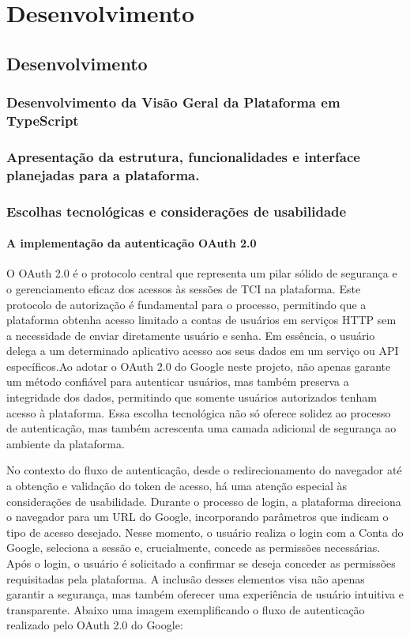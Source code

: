 \part{Desenvolvimento}
\chapter{Desenvolvimento}

\section{Desenvolvimento da Visão Geral da Plataforma em TypeScript}
\section{Apresentação da estrutura, funcionalidades e interface planejadas para a plataforma.}
\section{Escolhas tecnológicas e considerações de usabilidade}

\subsection{A implementação da autenticação OAuth 2.0}
O OAuth 2.0 é o protocolo central que representa um pilar sólido de segurança e o gerenciamento eficaz dos acessos às sessões de TCI na plataforma. Este protocolo de autorização é fundamental para o processo, permitindo que a plataforma obtenha acesso limitado a contas de usuários em serviços HTTP sem a necessidade de enviar diretamente usuário e senha. Em essência, o usuário delega a um determinado aplicativo acesso aos seus dados em um serviço ou API específicos.\cite{OAUTH}Ao adotar o OAuth 2.0 do Google neste projeto, não apenas garante um método confiável para autenticar usuários, mas também preserva a integridade dos dados, permitindo que somente usuários autorizados tenham acesso à plataforma. Essa escolha tecnológica não só oferece solidez ao processo de autenticação, mas também acrescenta uma camada adicional de segurança ao ambiente da plataforma.

No contexto do fluxo de autenticação, desde o redirecionamento do navegador até a obtenção e validação do token de acesso, há uma atenção especial às considerações de usabilidade. Durante o processo de login, a plataforma direciona o navegador para um URL do Google, incorporando parâmetros que indicam o tipo de acesso desejado. Nesse momento, o usuário realiza o login com a Conta do Google, seleciona a sessão e, crucialmente, concede as permissões necessárias. Após o login, o usuário é solicitado a confirmar se deseja conceder as permissões requisitadas pela plataforma. A inclusão desses elementos visa não apenas garantir a segurança, mas também oferecer uma experiência de usuário intuitiva e transparente. Abaixo uma imagem exemplificando o fluxo de autenticação realizado pelo OAuth 2.0 do Google\cite{OAUTHACESS}:

